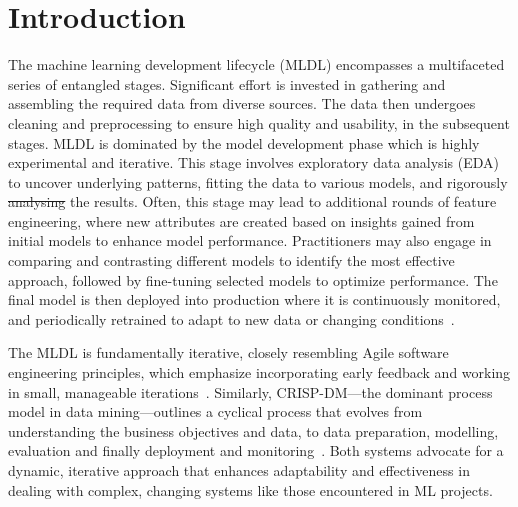 \documentclass[smallextended]{svjour3}       %
\providecommand{\DIFadd}[1]{{\protect\color{blue}\uwave{#1}}} %
\providecommand{\DIFdel}[1]{{\protect\color{red}\sout{#1}}} %
\providecommand{\DIFaddbegin}{} %
\providecommand{\DIFaddend}{} %
\providecommand{\DIFdelbegin}{} %
\providecommand{\DIFdelend}{} %
\newcommand{\DIFscaledelfig}{0.5}
\newlength{\DIFdelgraphicswidth} %
\newlength{\DIFdelgraphicsheight} %
\newcommand{\DIFaddincludegraphics}[2][]{{\color{blue}\fbox{\DIFOincludegraphics[#1]{#2}}}} %
\newcommand{\DIFdelincludegraphics}[2][]{%
\sbox{\DIFdelgraphicsbox}{\DIFOincludegraphics[#1]{#2}}%
\settoboxwidth{\DIFdelgraphicswidth}{\DIFdelgraphicsbox} %
\settoboxtotalheight{\DIFdelgraphicsheight}{\DIFdelgraphicsbox} %
\scalebox{\DIFscaledelfig}{%
\parbox[b]{\DIFdelgraphicswidth}{\usebox{\DIFdelgraphicsbox}\\[-\baselineskip] \rule{\DIFdelgraphicswidth}{0em}}\llap{\resizebox{\DIFdelgraphicswidth}{\DIFdelgraphicsheight}{%
\setlength{\unitlength}{\DIFdelgraphicswidth}%
\begin{picture}(1,1)%
\thicklines\linethickness{2pt} %
{\color[rgb]{1,0,0}\put(0,0){\framebox(1,1){}}}%
{\color[rgb]{1,0,0}\put(0,0){\line( 1,1){1}}}%
{\color[rgb]{1,0,0}\put(0,1){\line(1,-1){1}}}%
\end{picture}%
}\hspace*{3pt}}} %
} %
\DeclareRobustCommand{\DIFaddbegin}{\DIFOaddbegin \let\includegraphics\DIFaddincludegraphics} %
\DeclareRobustCommand{\DIFaddend}{\DIFOaddend \let\includegraphics\DIFOincludegraphics} %
\DeclareRobustCommand{\DIFdelbegin}{\DIFOdelbegin \let\includegraphics\DIFdelincludegraphics} %
\DeclareRobustCommand{\DIFdelend}{\DIFOaddend \let\includegraphics\DIFOincludegraphics} %
\begin{document}

\section{Introduction}
\DIFdelbegin %

\DIFdelend The machine learning development lifecycle (MLDL) encompasses a multifaceted series of entangled stages. Significant effort is invested in gathering and assembling the required data from diverse sources. The data then undergoes cleaning and preprocessing to ensure high quality and usability, in the subsequent stages. MLDL is dominated by the model development phase which is highly experimental and iterative. This stage involves exploratory data analysis (EDA) to uncover underlying patterns, fitting the data to various models, and rigorously \DIFdelbegin \DIFdel{analysing }\DIFdelend \DIFaddbegin \DIFadd{analyzing }\DIFaddend the results. Often, this stage may lead to additional rounds of feature engineering, where new attributes are created based on insights gained from initial models to enhance model performance. Practitioners may also engage in comparing and contrasting different models to identify the most effective approach, followed by fine-tuning selected models to optimize performance. The final model is then deployed into production where it is continuously monitored, and periodically retrained to adapt to new data or changing conditions~\citep{haakman2021ai,amershi2019software,sculley2015hidden}.

The MLDL is fundamentally iterative, closely resembling Agile software engineering principles, which emphasize incorporating early feedback and working in small, manageable iterations~\citep{betz2018managing}. Similarly, CRISP-DM---the dominant process model in data mining---outlines a cyclical process that evolves from understanding the business objectives and data, to data preparation, modelling, evaluation and finally deployment and monitoring~\citep{martinez-plumed2021crisp-dm}. Both systems advocate for a dynamic, iterative approach that enhances adaptability and effectiveness in dealing with complex, changing systems like those encountered in ML projects.
\end{document}
